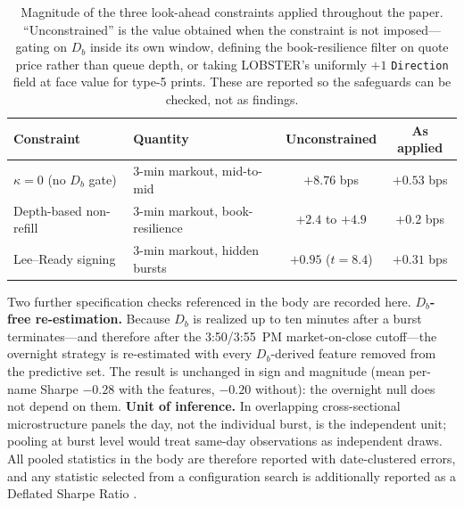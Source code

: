 \documentclass[11pt]{article}
\begin{document}
\begin{table}[htbp]
\centering
\begin{tabular}{llcc}
\toprule
\textbf{Constraint} & \textbf{Quantity} & \textbf{Unconstrained} & \textbf{As applied} \\
\midrule
$\kappa=0$ (no $D_b$ gate) & 3-min markout, mid-to-mid & $+8.76$ bps & $+0.53$ bps \\
Depth-based non-refill     & 3-min markout, book-resilience & $+2.4$ to $+4.9$ & $+0.2$ bps \\
Lee--Ready signing         & 3-min markout, hidden bursts & $+0.95$ ($t=8.4$) & $+0.31$ bps \\
\bottomrule
\end{tabular}
\caption{Magnitude of the three look-ahead constraints applied throughout the paper. ``Unconstrained'' is the value obtained when the constraint is not imposed---gating on $D_b$ inside its own window, defining the book-resilience filter on quote price rather than queue depth, or taking LOBSTER's uniformly $+1$ \texttt{Direction} field at face value for type-5 prints. These are reported so the safeguards can be checked, not as findings.}
\label{tab:safeguards}
\end{table}

Two further specification checks referenced in the body are recorded here. \textbf{$D_b$-free re-estimation.} Because $D_b$ is realized up to ten minutes after a burst terminates---and therefore after the 3:50/3:55~PM market-on-close cutoff---the overnight strategy is re-estimated with every $D_b$-derived feature removed from the predictive set. The result is unchanged in sign and magnitude (mean per-name Sharpe $-0.28$ with the features, $-0.20$ without): the overnight null does not depend on them. \textbf{Unit of inference.} In overlapping cross-sectional microstructure panels the day, not the individual burst, is the independent unit; pooling at burst level would treat same-day observations as independent draws. All pooled statistics in the body are therefore reported with date-clustered errors, and any statistic selected from a configuration search is additionally reported as a Deflated Sharpe Ratio \citep{bailey2014}.
\end{document}
